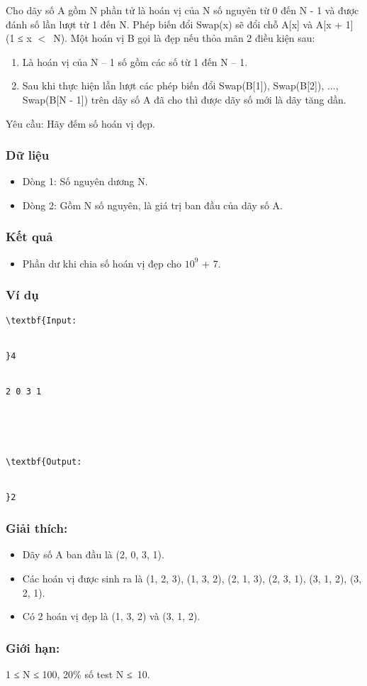 



   Cho dãy số A gồm N phần tử là hoán vị của N số nguyên từ 0 đến N - 1 và được đánh số lần lượt từ 1 đến N. Phép biến đổi Swap(x) sẽ đổi chỗ A[x] và A[x + 1] (1 ≤ x $<$ N). Một hoán vị B gọi là đẹp nếu thỏa mãn 2 điều kiện sau:  
\begin{enumerate}
	\item     Là hoán vị của N – 1 số gồm các số từ 1 đến N – 1.   
	\item     Sau khi thực hiện lần lượt các phép biến đổi Swap(B[1]), Swap(B[2]), ..., Swap(B[N - 1]) trên dãy số A đã cho thì được dãy số mới là dãy tăng dần.   
\end{enumerate}

   Yêu cầu: Hãy đếm số hoán vị đẹp.  

\subsubsection{   Dữ liệu  }
\begin{itemize}
	\item     Dòng 1: Số nguyên dương N.   
	\item     Dòng 2: Gồm N số nguyên, là giá trị ban đầu của dãy số A.   
\end{itemize}

\subsubsection{   Kết quả  }
\begin{itemize}
	\item     Phần dư khi chia số hoán vị đẹp cho $10^{9}$    + 7.   
\end{itemize}

\subsubsection{   Ví dụ  }
\begin{verbatim}
\textbf{Input:


}4


2 0 3 1





\textbf{Output:


}2\end{verbatim}

\subsubsection{   Giải thích:  }
\begin{itemize}
	\item     Dãy số A ban đầu là (2, 0, 3, 1).   
	\item     Các hoán vị được sinh ra là (1, 2, 3), (1, 3, 2), (2, 1, 3), (2, 3, 1), (3, 1, 2), (3, 2, 1).   
	\item     Có 2 hoán vị đẹp là (1, 3, 2) và (3, 1, 2).   
\end{itemize}

\subsubsection{\textbf{    Giới hạn:   }}

   1 ≤ N ≤ 100, 20\% số test N ≤ 10.  
